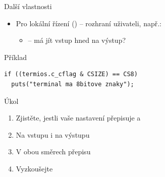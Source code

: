 \begin{frame}[fragile]{Další vlastnosti}
\begin{itemize}
\begin{itemize}
      \pause

      \item Pro lokální řízení () -- rozhraní uživateli,
        např.:
      \begin{itemize}
	\item {} -- má jít vstup hned na výstup?
      \end{itemize}

    \end{itemize}

  \end{itemize}

  \begin{block}{Příklad}
  \begin{lstlisting}
if ((termios.c_cflag & CSIZE) == CS8)
  puts("terminal ma 8bitove znaky");
  \end{lstlisting}
  \end{block}

\end{frame}

\begin{frame}{Úkol}

  \begin{enumerate}
    \item Zjistěte, jestli vaše nastavení přepisuje \code{\\n} a \code{\\r}
    \item Na vstupu i na výstupu
    \item V obou směrech přepisu
    \item Vyzkoušejte
  \end{enumerate}

\end{frame}

